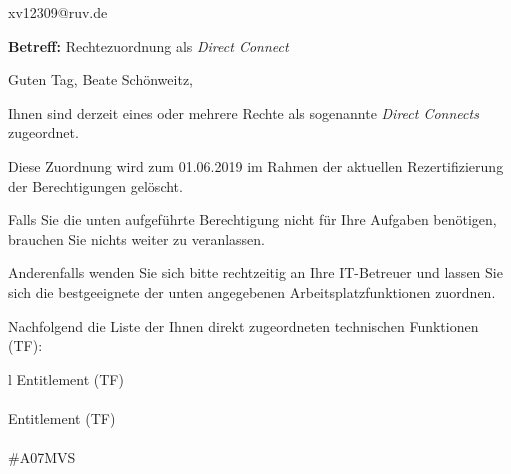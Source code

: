 \documentclass[a4paper,landscape,12pt]{letter}
\begin{document}
\begin{letter}{xv12309@ruv.de\hfill \break}
\begin{normalsize}
	\opening{\textbf{Betreff:} Rechtezuordnung als \emph{Direct Connect}}
	\begin{normalsize} \hfill
	\end{normalsize}

	\begin{normalsize}
		Guten Tag, 
	Beate Schönweitz, \hfill \break
	\end{normalsize}
	\end{normalsize}
	
\begin{normalsize}
	Ihnen sind derzeit eines oder mehrere Rechte als sogenannte \emph{Direct Connects} zugeordnet.
	
	Diese Zuordnung wird zum 01.06.2019 im Rahmen der aktuellen Rezertifizierung der Berechtigungen gelöscht.
	
	Falls Sie die unten aufgeführte Berechtigung nicht für Ihre Aufgaben benötigen, 
	brauchen Sie nichts weiter zu veranlassen.
	
	Anderenfalls wenden Sie sich bitte rechtzeitig an Ihre IT-Betreuer 
	und lassen Sie sich die bestgeeignete der unten angegebenen Arbeitsplatzfunktionen zuordnen.
	\end{normalsize}
	
\begin{normalsize}
	Nachfolgend die Liste der Ihnen direkt zugeordneten technischen Funktionen (TF):

	\begin{longtable}{l}
		Entitlement (TF) \\ \hline
		\endfirsthead
		\\\hline
		Entitlement (TF) \\ \hline
		\endhead %
		\multicolumn{1}{r@{}}{Fortsetzung \ldots}\\
		\endfoot
		\hline
		\endlastfoot
	\#A07MVS\\
	\end{longtable}
	\end{normalsize}
	

\end{letter}
\end{document}
